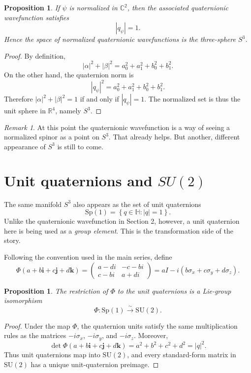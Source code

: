 \documentclass[11pt]{article}
\newtheorem{proposition}[definition]{Proposition}
\theoremstyle{remark}
\newtheorem{remark}[definition]{Remark}
\newcommand{\R}{\mathbb{R}}
\newcommand{\C}{\mathbb{C}}
\newcommand{\HH}{\mathbb{H}}
\newcommand{\SU}{\mathrm{SU}}
\newcommand{\Sp}{\mathrm{Sp}}
\newcommand{\ii}{\mathbf{i}}
\newcommand{\jj}{\mathbf{j}}
\newcommand{\kk}{\mathbf{k}}
\newcommand{\Id}{I}
\newcommand{\abs}[1]{\left\lvert #1 \right\rvert}
\newcommand{\set}[1]{\left\{ #1 \right\}}
\begin{document}
\begin{proposition}
If $\psi$ is normalized in $\C^2$, then the associated quaternionic wavefunction satisfies
\[
\abs{q_\psi} = 1.
\]
Hence the space of normalized quaternionic wavefunctions is the three-sphere $S^3$.
\end{proposition}

\begin{proof}
By definition,
\[
\abs{\alpha}^2 + \abs{\beta}^2
=
a_0^2 + a_1^2 + b_0^2 + b_1^2.
\]
On the other hand, the quaternion norm is
\[
\abs{q_\psi}^2 = a_0^2 + a_1^2 + b_0^2 + b_1^2.
\]
Therefore $\abs{\alpha}^2 + \abs{\beta}^2 = 1$ if and only if $\abs{q_\psi}=1$. The normalized set is thus the unit sphere in $\R^4$, namely $S^3$.
\end{proof}

\begin{remark}
At this point the quaternionic wavefunction is a way of seeing a normalized spinor as a point on $S^3$. That already helps. But another, different appearance of $S^3$ is still to come.
\end{remark}

\section{Unit quaternions and \texorpdfstring{$SU(2)$}{SU(2)}}

The same manifold $S^3$ also appears as the set of unit quaternions
\[
\Sp(1) = \set{q\in\HH : \abs{q}=1}.
\]
Unlike the quaternionic wavefunction in Section 2, however, a unit quaternion here is being used as a \emph{group element}. This is the transformation side of the story.

Following the convention used in the main series, define
\begin{equation}
\Phi(a+b\ii+c\jj+d\kk)
=
\begin{pmatrix}
a-di & -c-bi \\
c-bi & a+di
\end{pmatrix}
=
a\Id - i(b\sigma_x+c\sigma_y+d\sigma_z).
\label{eq:phi}
\end{equation}

\begin{proposition}
The restriction of $\Phi$ to the unit quaternions is a Lie-group isomorphism
\[
\Phi : \Sp(1) \xrightarrow{\sim} \SU(2).
\]
\end{proposition}

\begin{proof}
Under the map $\Phi$, the quaternion units satisfy the same multiplication rules as the matrices $-i\sigma_x$, $-i\sigma_y$, and $-i\sigma_z$. Moreover,
\[
\det\Phi(a+b\ii+c\jj+d\kk)=a^2+b^2+c^2+d^2=\abs{q}^2.
\]
Thus unit quaternions map into $\SU(2)$, and every standard-form matrix in $\SU(2)$ has a unique unit-quaternion preimage.
\end{proof}
\end{document}
